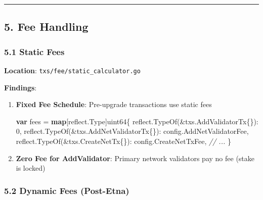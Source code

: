 \documentclass[
]{article}
\newenvironment{Shaded}{}{}
\newcommand{\CommentTok}[1]{\textcolor[rgb]{0.38,0.63,0.69}{\textit{#1}}}
\newcommand{\DataTypeTok}[1]{\textcolor[rgb]{0.56,0.13,0.00}{#1}}
\newcommand{\DecValTok}[1]{\textcolor[rgb]{0.25,0.63,0.44}{#1}}
\newcommand{\KeywordTok}[1]{\textcolor[rgb]{0.00,0.44,0.13}{\textbf{#1}}}
\newcommand{\NormalTok}[1]{#1}
\newcommand{\OperatorTok}[1]{\textcolor[rgb]{0.40,0.40,0.40}{#1}}
\begin{document}
\begin{center}\rule{0.5\linewidth}{0.5pt}\end{center}

\subsection{5. Fee Handling}\label{5-fee-handling}

\subsubsection{5.1 Static Fees}\label{51-static-fees}

\textbf{Location}: \texttt{txs/fee/static\_calculator.go}

\textbf{Findings}:

\begin{enumerate}
\def\labelenumi{\arabic{enumi}.}
\item
  \textbf{Fixed Fee Schedule}: Pre-upgrade transactions use static fees

\begin{Shaded}
\begin{Highlighting}[]
\KeywordTok{var}\NormalTok{ fees }\OperatorTok{=} \KeywordTok{map}\OperatorTok{[}\NormalTok{reflect}\OperatorTok{.}\NormalTok{Type}\OperatorTok{]}\DataTypeTok{uint64}\OperatorTok{\{}
\NormalTok{    reflect}\OperatorTok{.}\NormalTok{TypeOf}\OperatorTok{(\&}\NormalTok{txs}\OperatorTok{.}\NormalTok{AddValidatorTx}\OperatorTok{\{\}):}    \DecValTok{0}\OperatorTok{,}
\NormalTok{    reflect}\OperatorTok{.}\NormalTok{TypeOf}\OperatorTok{(\&}\NormalTok{txs}\OperatorTok{.}\NormalTok{AddNetValidatorTx}\OperatorTok{\{\}):}\NormalTok{ config}\OperatorTok{.}\NormalTok{AddNetValidatorFee}\OperatorTok{,}
\NormalTok{    reflect}\OperatorTok{.}\NormalTok{TypeOf}\OperatorTok{(\&}\NormalTok{txs}\OperatorTok{.}\NormalTok{CreateNetTx}\OperatorTok{\{\}):}\NormalTok{       config}\OperatorTok{.}\NormalTok{CreateNetTxFee}\OperatorTok{,}
    \CommentTok{// ...}
\OperatorTok{\}}
\end{Highlighting}
\end{Shaded}
\item
  \textbf{Zero Fee for AddValidator}: Primary network validators pay no
  fee (stake is locked)
\end{enumerate}

\subsubsection{5.2 Dynamic Fees
(Post-Etna)}\label{52-dynamic-fees-post-etna}
\end{document}
